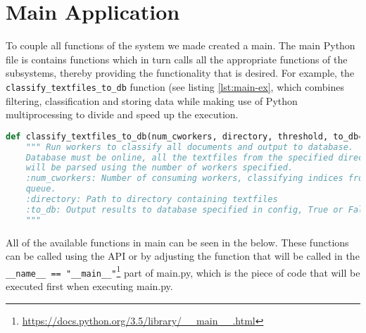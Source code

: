 \section{Main Application} \label{sec:main-app}
To couple all functions of the system we made created a main. The main Python file is contains functions which in turn calls all the appropriate functions of the subsystems, thereby providing the functionality that is desired. For example, the \texttt{classify\_textfiles\_to\_db} function (see listing \ref{lst:main-ex}, which combines filtering, classification and storing data while making use of Python multiprocessing to divide and speed up the execution.

\begin{lstlisting}[language=Python, caption=Header of a function in main.py, label={lst:main-ex}]
def classify_textfiles_to_db(num_cworkers, directory, threshold, to_db=False):
    """ Run workers to classify all documents and output to database.
    Database must be online, all the textfiles from the specified directory
    will be parsed using the number of workers specified.
    :num_cworkers: Number of consuming workers, classifying indices from the
    queue.
    :directory: Path to directory containing textfiles
    :to_db: Output results to database specified in config, True or False
    """
\end{lstlisting}

All of the available functions in main can be seen in the  below. These functions can be called using the API or by adjusting the function that will be called in the \texttt{\_\_name\_\_ == "\_\_main\_\_"}\footnote{\url{https://docs.python.org/3.5/library/__main__.html}} part of main.py, which is the piece of code that will be executed first when executing main.py.


